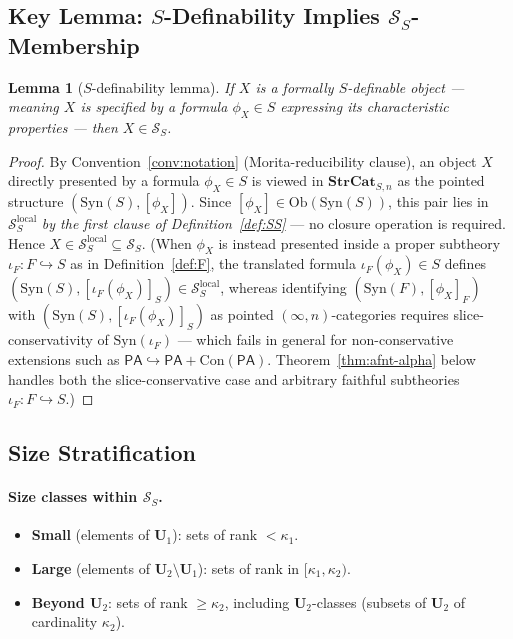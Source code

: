 \documentclass[11pt]{article}
\theoremstyle{plain}
\newtheorem{lemma}[theorem]{Lemma}
\theoremstyle{definition}
\newcommand{\cS}{\mathcal{S}}
\newcommand{\Ob}{\mathrm{Ob}}
\newcommand{\Syn}{\mathrm{Syn}}
\newcommand{\Con}{\mathrm{Con}}
\newcommand{\PA}{\mathsf{PA}}
\begin{document}
\subsection{\texorpdfstring{Key Lemma: $S$-Definability Implies $\cS_S$-Membership}{Key Lemma: S-Definability Implies S\_S-Membership}}

\begin{lemma}[$S$-definability lemma]\label{lem:SS-membership}
If $X$ is a formally $S$-definable object --- meaning $X$ is specified by a formula $\phi_X \in S$ expressing its characteristic properties --- then $X \in \cS_S$.
\end{lemma}

\begin{proof}
By Convention~\ref{conv:notation} (Morita-reducibility clause), an object $X$ directly presented by a formula $\phi_X \in S$ is viewed in $\mathbf{StrCat}_{S, n}$ as the pointed structure $(\Syn(S), [\phi_X])$. Since $[\phi_X] \in \Ob(\Syn(S))$, this pair lies in $\cS_S^{\mathrm{local}}$ \emph{by the first clause of Definition~\ref{def:SS}} --- no closure operation is required. Hence $X \in \cS_S^{\mathrm{local}} \subseteq \cS_S$. (When $\phi_X$ is instead presented inside a proper subtheory $\iota_F : F \hookrightarrow S$ as in Definition~\ref{def:F}, the translated formula $\iota_F(\phi_X) \in S$ defines $(\Syn(S), [\iota_F(\phi_X)]_S) \in \cS_S^{\mathrm{local}}$, whereas identifying $(\Syn(F), [\phi_X]_F)$ with $(\Syn(S), [\iota_F(\phi_X)]_S)$ as pointed $(\infty, n)$-categories requires slice-conservativity of $\Syn(\iota_F)$ --- which fails in general for non-conservative extensions such as $\PA \hookrightarrow \PA + \Con(\PA)$. Theorem~\ref{thm:afnt-alpha} below handles both the slice-conservative case and arbitrary faithful subtheories $\iota_F : F \hookrightarrow S$.)
\end{proof}

\subsection{Size Stratification}\label{sec:size-stratification}

\paragraph{Size classes within $\cS_S$.}
\begin{itemize}
\item \textbf{Small} (elements of $\mathbf{U}_1$): sets of rank $< \kappa_1$.
\item \textbf{Large} (elements of $\mathbf{U}_2 \setminus \mathbf{U}_1$): sets of rank in $[\kappa_1, \kappa_2)$.
\item \textbf{Beyond $\mathbf{U}_2$}: sets of rank $\geq \kappa_2$, including $\mathbf{U}_2$-classes (subsets of $\mathbf{U}_2$ of cardinality $\kappa_2$).
\end{itemize}
\end{document}
